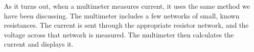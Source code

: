%

As it turns out, when a multimeter measures current, it uses the same 
method we have been discussing. The multimeter includes a few networks of
small, known resistances. The current is sent through the appropriate 
resistor network, and the voltage across that network is measured. The
multimeter then calculates the current and displays it. 

%

